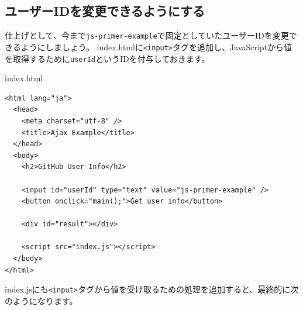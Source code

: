 \hypertarget{changeable-userid}{%
\subsection{ユーザーIDを変更できるようにする}\label{changeable-userid}}

仕上げとして、今まで\texttt{js-primer-example}で固定としていたユーザーIDを変更できるようにしましょう。
index.htmlに\texttt{<input>}タグを追加し、JavaScriptから値を取得するために\texttt{userId}というIDを付与しておきます。

\begin{listtitle}
index.html
\end{listtitle}
\begin{lstlisting}
<html lang="ja">
  <head>
    <meta charset="utf-8" />
    <title>Ajax Example</title>
  </head>
  <body>
    <h2>GitHub User Info</h2>

    <input id="userId" type="text" value="js-primer-example" />
    <button onclick="main();">Get user info</button>

    <div id="result"></div>

    <script src="index.js"></script>
  </body>
</html>
\end{lstlisting}
\listend

index.jsにも\texttt{<input>}タグから値を受け取るための処理を追加すると、最終的に次のようになります。

